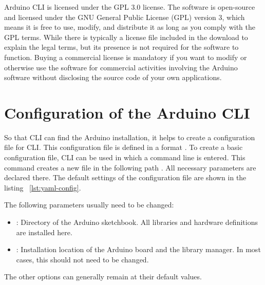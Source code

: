 Arduino CLI is licensed under the GPL 3.0 license. The software is open-source and licensed under the GNU General Public License (GPL) version 3, which means it is free to use, modify, and distribute it as long as you comply with the GPL terms. While there is typically a license file included in the download to explain the legal terms, but its presence is not required for the software to function. Buying a commercial license is mandatory if you want to modify or otherwise use the software for commercial activities involving the Arduino software without disclosing the source code of your own applications. \cite{ArduinoCLIGit:2024}


\section{Configuration of the Arduino CLI}

So that CLI can find the Arduino installation, it helps to create a configuration file for CLI. This configuration file is defined in a format . To create a basic configuration file, CLI can be used in which a command line
is entered. This command creates a new file  in the following path . All necessary parameters are declared there. The default settings of the configuration file are shown in the listing ~\ref{lst:yaml-config}. 

%


	
{
  \label{lst:yaml-config}
}


The following parameters usually need to be changed:
\begin{itemize}
	\item {}: Directory of the Arduino sketchbook. All libraries and hardware definitions are installed here.
	\item {}: Installation location of the Arduino board and the library manager. In most cases, this should not need to be changed.
\end{itemize}
The other options can generally remain at their default values.


